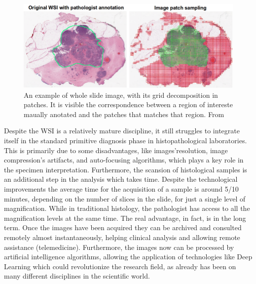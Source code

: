 \begin{figure}
    \centering
    \includegraphics[width = \textwidth]{images/patches_grid}
    \caption{An example of whole slide image, with its grid decomposition in patches. It is visible the correspondence between a region of intereste maually anotated and the patches that matches that region. From \cite{WSI_grid}}
    \label{fig:patches_grid}
\end{figure}

Despite the WSI is a relatively mature discipline, it still struggles to integrate itself in the standard primitive diagnosis phase in histopathological laboratories. This is primarily due to some disadvantages, like images'resolution, image compression's artifacts, and auto-focusing algorithms, which plays a key role in the specimen interpretation. Furthermore, the scansion of histological samples is an additional step in the analysis which takes time. Despite the technological improvements the average time for the acquisition of a sample is around 5/10 minutes, depending on the number of slices in the slide, for just a single level of magnification. While in traditional histology, the pathologist has access to all the magnification levels at the same time. The real advantage, in fact, is in the long term. Once the images have been acquired they can be archived and consulted remotely almost instantaneously, helping clinical analysis and allowing remote assistance (telemedicine). Furthermore, the images now can be processed by artificial intelligence algorithms, allowing the application of technologies like Deep Learning which could revolutionize the research field, as already has been on many different disciplines in the scientific world.

